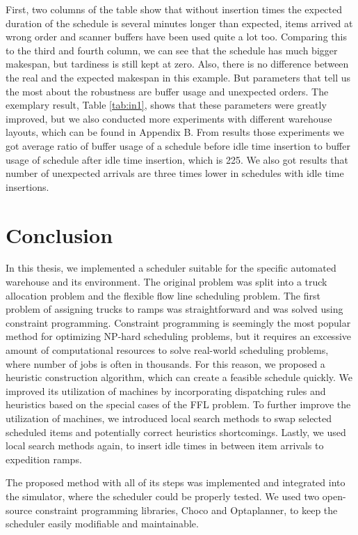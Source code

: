 \documentclass{ctuthesis}
\begin{document}
First, two columns of the table show that without insertion times the expected duration of the schedule is several minutes longer than expected, items arrived at wrong order and scanner buffers have been used quite a lot too. Comparing this to the third and fourth column, we can see that the schedule has much bigger makespan, but tardiness is still kept at zero. Also, there is no difference between the real and the expected makespan in this example. But parameters that tell us the most about the robustness are buffer usage and unexpected orders. The exemplary result, Table \ref{tab:in1}, shows that these parameters were greatly improved, but we also conducted more experiments with different warehouse layouts, which can be found in Appendix B. From results those experiments we got average ratio of buffer usage of a schedule before idle time insertion to buffer usage of schedule after idle time insertion, which is 225. We also got results that number of unexpected arrivals are three times lower in schedules with idle time insertions. 

\chapter{Conclusion}

In this thesis, we implemented a scheduler suitable for the specific automated warehouse and its environment. 
The original problem was split into a truck allocation problem and the flexible flow line scheduling problem.
The first problem of assigning trucks to ramps was straightforward and was solved using constraint programming. Constraint programming is seemingly the most popular method for optimizing NP-hard scheduling problems, but it requires an excessive amount of computational resources to solve real-world scheduling problems, where number of jobs is often in thousands. For this reason, we proposed a heuristic construction algorithm, which can create a feasible schedule quickly. We improved its utilization of machines by incorporating dispatching rules and heuristics based on the special cases of the FFL problem. To further improve the utilization of machines, we introduced local search methods to swap selected scheduled items and potentially correct heuristics shortcomings. Lastly, we used local search methods again, to insert idle times in between item arrivals to expedition ramps.

The proposed method with all of its steps was implemented and integrated into the simulator, where the scheduler could be properly tested. We used two open-source constraint programming libraries, Choco and Optaplanner, to keep the scheduler easily modifiable and maintainable.
\end{document}
